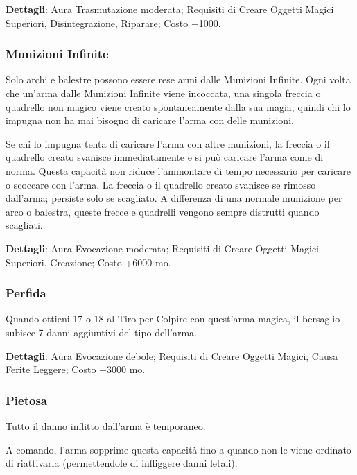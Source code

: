 \begin{multicols}{2}
\textbf{Dettagli}: Aura Trasmutazione moderata; Requisiti di Creare Oggetti Magici Superiori, Disintegrazione, Riparare; Costo +1000.

\subsubsection*{Munizioni Infinite}

Solo archi e balestre possono essere rese armi dalle Munizioni Infinite. Ogni volta che un'arma dalle Munizioni Infinite viene incoccata, una singola freccia o quadrello non magico viene creato spontaneamente dalla sua magia, quindi chi lo impugna non ha mai bisogno di caricare l'arma con delle munizioni.

Se chi lo impugna tenta di caricare l'arma con altre munizioni, la freccia o il quadrello creato svanisce immediatamente e si può caricare l'arma come di norma. Questa capacità non riduce l'ammontare di tempo necessario per caricare o scoccare con l'arma. La freccia o il quadrello creato svanisce se rimosso dall'arma; persiste solo se scagliato. A differenza di una normale munizione per arco o balestra, queste frecce e quadrelli vengono sempre distrutti quando scagliati.

\textbf{Dettagli}: Aura Evocazione moderata; Requisiti di Creare Oggetti Magici Superiori, Creazione; Costo +6000 mo.

\subsubsection*{Perfida}

Quando ottieni 17 o 18 al Tiro per Colpire con quest'arma magica, il bersaglio subisce 7 danni aggiuntivi del tipo dell'arma.

\textbf{Dettagli}: Aura Evocazione debole; Requisiti di Creare Oggetti Magici, Causa Ferite Leggere; Costo +3000 mo.

\subsubsection*{Pietosa}

Tutto il danno inflitto dall'arma è temporaneo.

A comando, l'arma sopprime questa capacità fino a quando non le viene ordinato di riattivarla (permettendole di infliggere danni letali).


\end{multicols}
